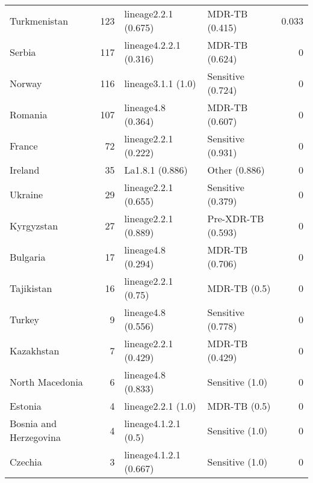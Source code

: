 \begin{tabular}{lrllr}
 Turkmenistan                                 &           123 & lineage2.2.1 (0.675)     & MDR-TB (0.415)      &      0.033 \\
 Serbia                                       &           117 & lineage4.2.2.1 (0.316)   & MDR-TB (0.624)      &      0     \\
 Norway                                       &           116 & lineage3.1.1 (1.0)       & Sensitive (0.724)   &      0     \\
 Romania                                      &           107 & lineage4.8 (0.364)       & MDR-TB (0.607)      &      0     \\
 France                                       &            72 & lineage2.2.1 (0.222)     & Sensitive (0.931)   &      0     \\
 Ireland                                      &            35 & La1.8.1 (0.886)          & Other (0.886)       &      0     \\
 Ukraine                                      &            29 & lineage2.2.1 (0.655)     & Sensitive (0.379)   &      0     \\
 Kyrgyzstan                                   &            27 & lineage2.2.1 (0.889)     & Pre-XDR-TB (0.593)  &      0     \\
 Bulgaria                                     &            17 & lineage4.8 (0.294)       & MDR-TB (0.706)      &      0     \\
 Tajikistan                                   &            16 & lineage2.2.1 (0.75)      & MDR-TB (0.5)        &      0     \\
 Turkey                                       &             9 & lineage4.8 (0.556)       & Sensitive (0.778)   &      0     \\
 Kazakhstan                                   &             7 & lineage2.2.1 (0.429)     & MDR-TB (0.429)      &      0     \\
 North Macedonia                              &             6 & lineage4.8 (0.833)       & Sensitive (1.0)     &      0     \\
 Estonia                                      &             4 & lineage2.2.1 (1.0)       & MDR-TB (0.5)        &      0     \\
 Bosnia and Herzegovina                       &             4 & lineage4.1.2.1 (0.5)     & Sensitive (1.0)     &      0     \\
 Czechia                                      &             3 & lineage4.1.2.1 (0.667)   & Sensitive (1.0)     &      0     \\

\end{tabular}
